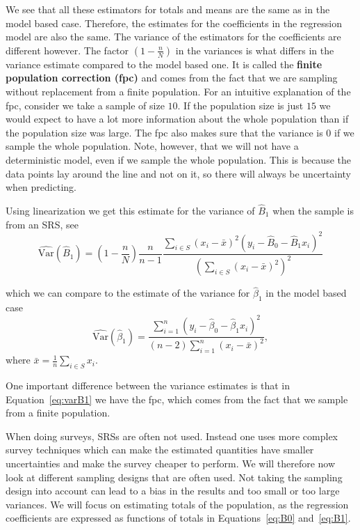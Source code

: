 \documentclass{article}
\begin{document}
We see that all these estimators for totals and means are the same as in the
model based case. Therefore, the estimates for the coefficients in the regression
model are also the same. The variance of the estimators for the coefficients are
different however.
The factor \(\left( 1 - \frac{n}{N} \right)\) in the variances is what differs in
the variance estimate compared to the model based one. It is called the
\textbf{finite population correction (fpc)} and comes from the fact that we are
sampling without replacement from a finite population.
For an intuitive explanation of the fpc, consider we take a sample of size
\(10\). If the population size is just \(15\) we would expect to have a lot more
information about the whole population than if the population size was large.
The fpc also makes sure that the variance is \(0\) if we sample the whole
population. Note, however, that we will not have a deterministic model, even if
we sample the whole population. This is because the data points lay around
the line and not on it, so there will always be uncertainty when predicting.

Using linearization we get this estimate for the variance of \(\hat{B}_1\) when
the sample is from an SRS, see \cite[Chapter 11.2]{sampReg}  \begin{equation} \label{eq:varB1}
\widehat{\mathrm{Var}}(\hat{B}_1) = \left( 1 - \frac{n}{N} \right) \frac{n}{n - 1} \frac{\sum_{i \in S} \left( x_i - \bar{x} \right)^2 \left( y_i - \hat{B}_0 - \hat{B}_1 x_i \right)^2}
{\left( \sum_{i \in S} \left( x_i - \bar{x} \right)^2 \right)^2}
\end{equation}

which we can compare to the estimate of the variance for \(\hat{\beta}_1\) in
the model based case
\begin{equation} \label{eq:varBeta1}
 \widehat{\mathrm{Var}} \left( \hat{\beta}_1 \right) = \frac{\sum_{i = 1}^n\left( y_i - \hat{\beta}_0 -
 \hat{\beta}_1 x_i \right)^2}{
   \left( n - 2 \right)\sum_{i = 1}^n \left( x_i - \bar{x} \right)^2},
\end{equation}
where \(\bar{x} = \frac{1}{n} \sum_{i \in S} x_i\).

One important difference between the variance estimates is that in Equation~\ref{eq:varB1} we have the fpc,
which comes from the fact that we sample from a finite population.

When doing surveys, SRSs are often not used. Instead one uses more complex survey
techniques which can make the estimated quantities have smaller uncertainties
and make the survey cheaper to perform. We will therefore now look at different
sampling designs that are often used. Not taking the sampling design into
account can lead to a bias in the results and too small or too large variances.
We will focus on estimating totals of the population, as the regression
coefficients are expressed as functions of totals in
Equations~\ref{eq:B0} and~\ref{eq:B1}.
\end{document}

